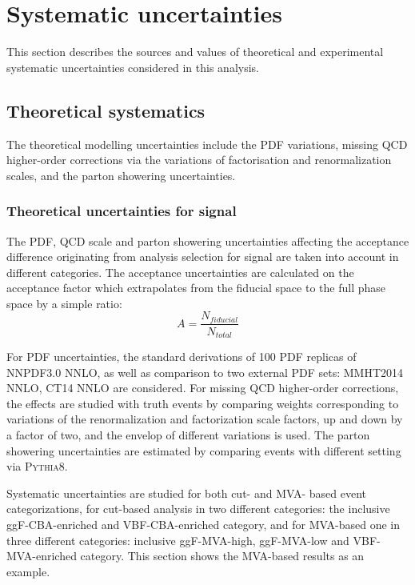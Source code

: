 \section{Systematic uncertainties}
\label{sec:hmhzz_sys}

This section describes the sources and values of theoretical and experimental systematic uncertainties considered in this analysis.

\subsection{Theoretical systematics}

The theoretical modelling uncertainties include the PDF variations, missing QCD higher-order corrections via the variations of factorisation and renormalization scales,
and the parton showering uncertainties.

\subsubsection{Theoretical uncertainties for signal}
\label{sec:hmhzz_theo_signal}

The PDF, QCD scale and parton showering uncertainties affecting the acceptance difference originating from analysis selection for signal are taken into account in different categories.
The acceptance uncertainties are calculated on the acceptance factor which extrapolates from the fiducial space to the full phase space by a simple ratio:
\begin{equation}
        A = \frac{N_{fiducial}}{N_{total}}
\end{equation}

For PDF uncertainties, the standard derivations of 100 PDF replicas of NNPDF3.0 NNLO, as well as comparison to two external PDF sets: MMHT2014 NNLO, CT14 NNLO are considered.
For missing QCD higher-order corrections, the effects are studied with truth events by comparing weights corresponding to
variations of the renormalization and factorization scale factors, up and down by a factor of two, and the envelop of different variations is used.
The parton showering uncertainties are estimated by comparing events with different setting via \textsc{Pythia8}.

Systematic uncertainties are studied for both cut- and MVA- based event categorizations, 
for cut-based analysis in two different categories: the inclusive ggF-CBA-enriched and VBF-CBA-enriched category,
and for MVA-based one in three different categories: inclusive ggF-MVA-high, ggF-MVA-low and VBF-MVA-enriched category.
This section shows the MVA-based results as an example.

